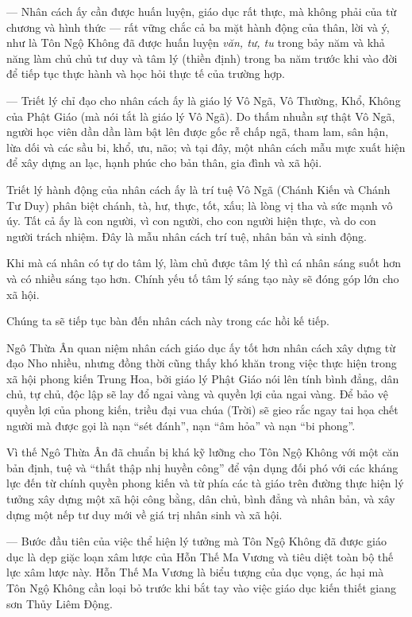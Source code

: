 — Nhân cách ấy cần được huấn luyện, giáo dục rất thực, mà không phải của từ chương và hình thức — rất vững chắc cả ba mặt hành động của thân, lời và ý, như là Tôn Ngộ Không đã được huấn luyện \emph{văn, tư, tu} trong bảy năm và khả năng làm chủ chủ tư duy và tâm lý (thiền định) trong ba năm trước khi vào đời để tiếp tục thực hành và học hỏi thực tế của trường hợp.

— Triết lý chỉ đạo cho nhân cách ấy là giáo lý Vô Ngã, Vô Thường, Khổ, Không của Phật Giáo (mà nói tắt là giáo lý Vô Ngã). Do thấm nhuần sự thật Vô Ngã, người học viên dần dần làm bật lên được gốc rễ chấp ngã, tham lam, sân hận, lừa dối và các sầu bi, khổ, ưu, não; và tại đây, một nhân cách mẫu mực xuất hiện để xây dựng an lạc, hạnh phúc cho bản thân, gia đình và xã hội.

Triết lý hành động của nhân cách ấy là trí tuệ Vô Ngã (Chánh Kiến và Chánh Tư Duy) phân biệt chánh, tà, hư, thực, tốt, xấu; là lòng vị tha và sức mạnh vô úy. Tất cả ấy là con người, vì con người, cho con người hiện thực, và do con người trách nhiệm. Đây là mẫu nhân cách trí tuệ, nhân bản và sinh động.

Khi mà cá nhân có tự do tâm lý, làm chủ được tâm lý thì cá nhân sáng suốt hơn và có nhiều sáng tạo hơn. Chính yếu tố tâm lý sáng tạo này sẽ đóng góp lớn cho xã hội.

Chúng ta sẽ tiếp tục bàn đến nhân cách này trong các hồi kế tiếp.

Ngô Thừa Ân quan niệm nhân cách giáo dục ấy tốt hơn nhân cách xây dựng từ đạo Nho nhiều, nhưng đồng thời cũng thấy khó khăn trong việc thực hiện trong xã hội phong kiến Trung Hoa, bởi giáo lý Phật Giáo nói lên tính bình đẳng, dân chủ, tự chủ, độc lập sẽ lay đổ ngai vàng và quyền lợi của ngai vàng. Để bảo vệ quyền lợi của phong kiến, triều đại vua chúa (Trời) sẽ gieo rắc ngay tai họa chết người mà được gọi là nạn ``sét đánh'', nạn ``âm hỏa'' và nạn ``bi phong''.

Vì thế Ngô Thừa Ân đã chuẩn bị khá kỹ lưỡng cho Tôn Ngộ Không với một căn bản định, tuệ và ``thất thập nhị huyền công'' để vận dụng đối phó với các kháng lực đến từ chính quyền phong kiến và từ phía các tà giáo trên đường thực hiện lý tưởng xây dựng một xã hội công bằng, dân chủ, bình đẳng và nhân bản, và xây dựng một nếp tư duy mới về giá trị nhân sinh và xã hội.

— Bước đầu tiên của việc thể hiện lý tưởng mà Tôn Ngộ Không đã được giáo dục là dẹp giặc loạn xâm lược của Hỗn Thế Ma Vương và tiêu diệt toàn bộ thế lực xâm lược này. Hỗn Thế Ma Vương là biểu tượng của dục vọng, ác hại mà Tôn Ngộ Không cần loại bỏ trước khi bắt tay vào việc giáo dục kiến thiết giang sơn Thủy Liêm Động.

